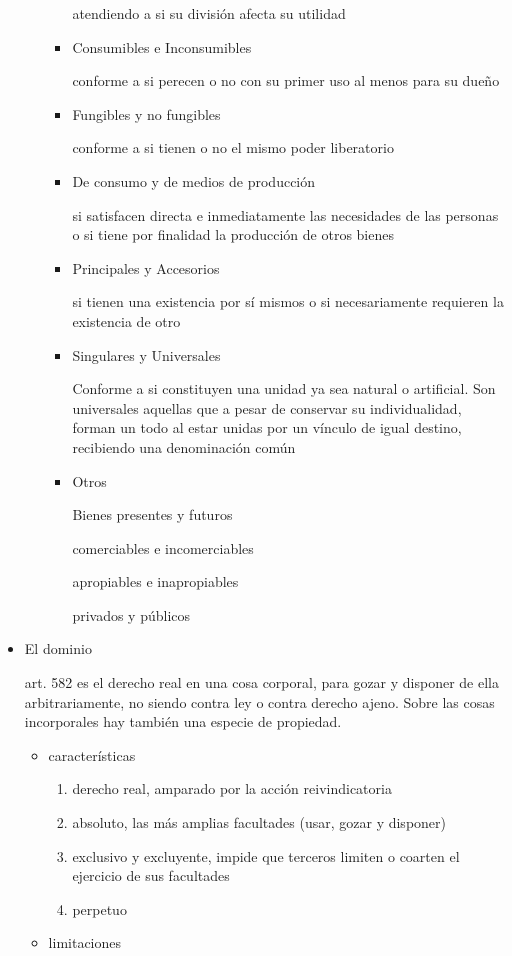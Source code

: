 \documentclass[]{article}
\providecommand{\tightlist}{%
  \setlength{\itemsep}{0pt}\setlength{\parskip}{0pt}}
\begin{document}
\begin{itemize}
\begin{itemize}
\begin{itemize}
      atendiendo a si su división afecta su utilidad
    \item
      Consumibles e Inconsumibles

      conforme a si perecen o no con su primer uso al menos para su
      dueño
    \item
      Fungibles y no fungibles

      conforme a si tienen o no el mismo poder liberatorio
    \item
      De consumo y de medios de producción

      si satisfacen directa e inmediatamente las necesidades de las
      personas o si tiene por finalidad la producción de otros bienes
    \item
      Principales y Accesorios

      si tienen una existencia por sí mismos o si necesariamente
      requieren la existencia de otro
    \item
      Singulares y Universales

      Conforme a si constituyen una unidad ya sea natural o artificial.
      Son universales aquellas que a pesar de conservar su
      individualidad, forman un todo al estar unidas por un vínculo de
      igual destino, recibiendo una denominación común
    \item
      Otros

      Bienes presentes y futuros

      comerciables e incomerciables

      apropiables e inapropiables

      privados y públicos
    \end{itemize}
  \end{itemize}
\item
  El dominio

  art. 582 es el derecho real en una cosa corporal, para gozar y
  disponer de ella arbitrariamente, no siendo contra ley o contra
  derecho ajeno. Sobre las cosas incorporales hay también una especie de
  propiedad.

  \begin{itemize}
  \tightlist
  \item
    características

    \begin{enumerate}
    \def\labelenumi{\arabic{enumi}.}
    \tightlist
    \item
      derecho real, amparado por la acción reivindicatoria
    \item
      absoluto, las más amplias facultades (usar, gozar y disponer)
    \item
      exclusivo y excluyente, impide que terceros limiten o coarten el
      ejercicio de sus facultades
    \item
      perpetuo
    \end{enumerate}
  \item
    limitaciones


\end{itemize}
\end{itemize}
\end{document}
